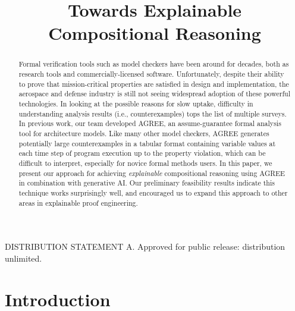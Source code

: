 \documentclass[conference]{IEEEtran}
\begin{document}
\title{Towards Explainable Compositional Reasoning}

\author{
	}



\maketitle

\begin{abstract}

Formal verification tools such as model checkers have been around for decades, both as research tools and commercially-licensed software.  Unfortunately, despite their ability to prove that mission-critical properties are satisfied in design and implementation, the aerospace and defense industry is still not seeing widespread adoption of these powerful technologies. 
%
%
In looking at the possible reasons for slow uptake, difficulty in understanding analysis results (i.e., counterexamples) tops the list of multiple surveys.
%
In previous work, our team developed AGREE, an assume-guarantee formal analysis tool for architecture models.  Like many other model checkers, AGREE generates potentially large counterexamples in a tabular format containing variable values at each time step of program execution up to the property violation, which can be difficult to interpret, especially for novice formal methods users.
In this paper, we present our approach for achieving \textit{explainable} compositional reasoning using AGREE in combination with generative AI.  Our preliminary feasibility results indicate this technique works surprisingly well, and encouraged us to expand this approach to other areas in explainable proof engineering.  
	

\end{abstract}

DISTRIBUTION STATEMENT A. Approved for public release: distribution unlimited.

\section{Introduction}
\label{sec:introduction}

\end{document}
